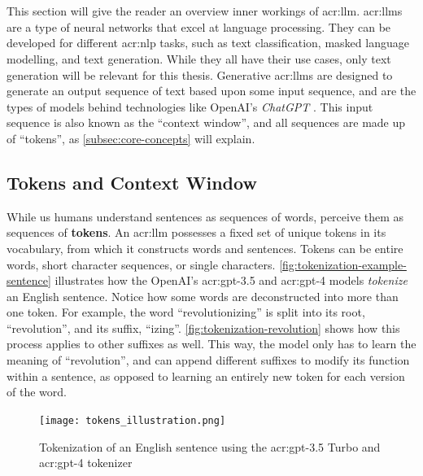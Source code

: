 \section[Large Language Models]{}
\label{sec:llms}

This section will give the reader an overview inner workings of \acrlong{acr:llm}. \glspl{acr:llm} are a type of neural networks that excel at language processing. They can be developed for different \gls{acr:nlp} tasks, such as text classification, masked language modelling, and text generation. While they all have their use cases, only text generation will be relevant for this thesis. Generative \glspl{acr:llm} are designed to generate an output sequence of text based upon some input sequence, and are the types of models behind technologies like OpenAI's \textit{ChatGPT} \citep{openaiIntroducingChatGPT2022}. This input sequence is also known as the \enquote{context window}, and all sequences are made up of \enquote{tokens}, as \autoref{subsec:core-concepts} will explain.


\subsection{Tokens and Context Window}
\label{subsec:core-concepts}

While us humans understand sentences as sequences of words,  perceive them as sequences of \textbf{tokens}. An \acrshort{acr:llm} possesses a fixed set of unique tokens in its vocabulary, from which it constructs words and sentences. Tokens can be entire words, short character sequences, or single characters. \autoref{fig:tokenization-example-sentence} illustrates how the OpenAI's \acrshort{acr:gpt}-3.5 and \acrshort{acr:gpt}-4 models \textit{tokenize} an English sentence. Notice how some words are deconstructed into more than one token. For example, the word \enquote{revolutionizing} is split into its root, \enquote{revolution}, and its suffix, \enquote{izing}. \autoref{fig:tokenization-revolution} shows how this process applies to other suffixes as well. This way, the model only has to learn the meaning of \enquote{revolution}, and can append different suffixes to modify its function within a sentence, as opposed to learning an entirely new token for each version of the word.

\begin{figure}[htp]
    \centering
    \texttt{[image: tokens\_illustration.png]}
    \caption{Tokenization of an English sentence using the \acrshort{acr:gpt}-3.5 Turbo and \acrshort{acr:gpt}-4 tokenizer}
    \label{fig:tokenization-example-sentence}
\end{figure}


